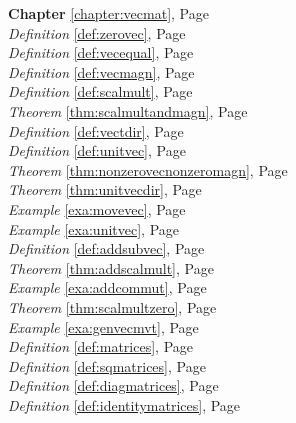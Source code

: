 \begin{multicols}{3}
   \begin{center}
      \textbf{Chapter} \ref{chapter:vecmat}, Page \pageref{chapter:vecmat} \\
      \textit{Definition} \ref{def:zerovec}, Page \pageref{def:zerovec} \\
      \textit{Definition} \ref{def:vecequal}, Page \pageref{def:vecequal} \\
      \textit{Definition} \ref{def:vecmagn}, Page \pageref{def:vecmagn} \\
      \textit{Definition} \ref{def:scalmult}, Page \pageref{def:scalmult} \\
      \textit{Theorem} \ref{thm:scalmultandmagn}, Page \pageref{thm:scalmultandmagn} \\
      \textit{Definition} \ref{def:vectdir}, Page \pageref{def:vectdir} \\
      \textit{Definition} \ref{def:unitvec}, Page \pageref{def:unitvec} \\
      \textit{Theorem} \ref{thm:nonzerovecnonzeromagn}, Page \pageref{thm:nonzerovecnonzeromagn} \\
      \textit{Theorem} \ref{thm:unitvecdir}, Page \pageref{thm:unitvecdir} \\
      \textit{Example} \ref{exa:movevec}, Page \pageref{exa:movevec} \\
      \textit{Example} \ref{exa:unitvec}, Page \pageref{exa:unitvec} \\
      \textit{Definition} \ref{def:addsubvec}, Page \pageref{def:addsubvec} \\
      \textit{Theorem} \ref{thm:addscalmult}, Page \pageref{thm:addscalmult} \\
      \textit{Example} \ref{exa:addcommut}, Page \pageref{exa:addcommut} \\
      \textit{Theorem} \ref{thm:scalmultzero}, Page \pageref{thm:scalmultzero} \\
      \textit{Example} \ref{exa:genvecmvt}, Page \pageref{exa:genvecmvt} \\
      \textit{Definition} \ref{def:matrices}, Page \pageref{def:matrices} \\
      \textit{Definition} \ref{def:sqmatrices}, Page \pageref{def:sqmatrices} \\
      \textit{Definition} \ref{def:diagmatrices}, Page \pageref{def:diagmatrices} \\
      \textit{Definition} \ref{def:identitymatrices}, Page \pageref{def:identitymatrices} \\

\end{center}
\end{multicols}
